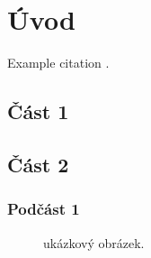 \documentclass[12pt,a4paper]{article} %
\begin{document}
\newpage

\tableofcontents %

\newpage %


\section{Úvod} %

Example citation \cite{1}.


\subsection{Část 1} %

\lipsum[1] %


\subsection{Část 2} %

\lipsum[2] %


\subsubsection{Podčást 1} %

\lipsum[3] %

\begin{figure}[H] %
\caption{ukázkový obrázek.}
\label{fig:speciation}
\end{figure}
\end{document}
